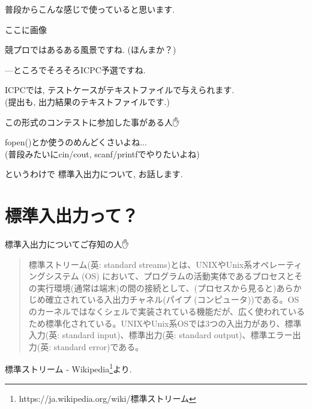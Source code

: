 \documentclass[uplatex, dvipdfmx, unicode]{beamer}
\begin{document}
\begin{frame}
  普段からこんな感じで使っていると思います.
  
  \centering
  ここに画像
\end{frame}

\begin{frame}
  競プロではあるある風景ですね. (ほんまか？)
\end{frame}

\begin{frame}
  ---ところでそろそろICPC予選ですね.
\end{frame}

\begin{frame}
  ICPCでは, テストケースがテキストファイルで与えられます.\\
  (提出も, 出力結果のテキストファイルです.)
\end{frame}

\begin{frame}{}
  \centering
  \Huge{この形式のコンテストに参加した事がある人✋}
\end{frame}

\begin{frame}{}
  fopen()とか使うのめんどくさいよね... \\
  (普段みたいにcin/cout, scanf/printfでやりたいよね)
\end{frame}

\begin{frame}{というわけで}
  標準入出力について, お話します.
\end{frame}

\section{標準入出力って？}
\begin{frame}
  \centering
  \Huge{標準入出力についてご存知の人✋}
\end{frame}

\begin{frame}
  \begin{quote}
    標準ストリーム(英: standard streams)とは、UNIXやUnix系オペレーティングシステム (OS) において、プログラムの活動実体であるプロセスとその実行環境(通常は端末)の間の接続として、(プロセスから見ると)あらかじめ確立されている入出力チャネル(パイプ (コンピュータ))である。OSのカーネルではなくシェルで実装されている機能だが、広く使われているため標準化されている。UNIXやUnix系OSでは3つの入出力があり、標準入力(英: standard input)、標準出力(英: standard output)、標準エラー出力(英: standard error)である。
  \end{quote}
  \small{標準ストリーム - Wikipedia\footnote{https://ja.wikipedia.org/wiki/標準ストリーム}より.}
\end{frame}
\end{document}
